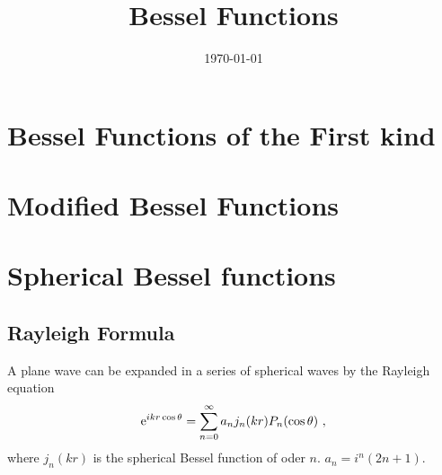 \documentclass[12pt,a4paper]{article}
\title{Bessel Functions}
\author{}
\date{\today}
\begin{document}
\maketitle

\section{Bessel Functions of the First kind}
\cite{arfken}








\section{Modified Bessel Functions}
\cite{arfken}































\section{Spherical Bessel functions}
\cite{arfken}
















\subsection{Rayleigh Formula}
\cite{arfken} A plane wave can be expanded in a series of spherical waves by the Rayleigh equation
\begin{equation}
{\rm e}^{i kr \cos \theta} = \sum_{n=0}^\infty a_n j_n(kr) P_n(\cos \theta) ~,
\label{eq:rayleigh}
\end{equation}
where $j_n(kr)$ is the spherical Bessel function of oder $n$. $a_n = i^n (2n +1)$.
\end{document}
